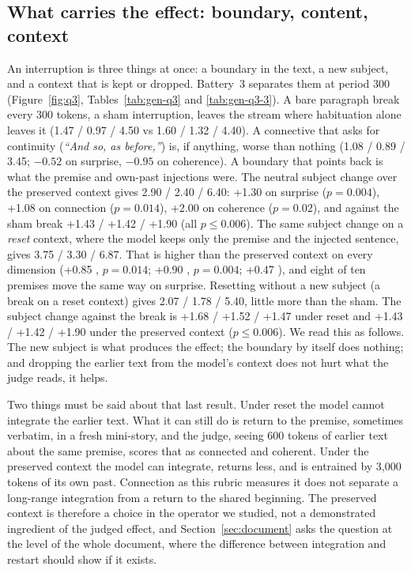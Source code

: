 \subsection{What carries the effect: boundary, content, context}
\label{sec:battery3}

An interruption is three things at once: a boundary in the text, a new
subject, and a context that is kept or dropped. Battery~3 separates them at
period 300 (Figure~\ref{fig:q3}, Tables~\ref{tab:gen-q3} and
\ref{tab:gen-q3-3}). A bare paragraph break every 300 tokens, a sham
interruption, leaves the stream where habituation alone leaves it (1.47 /
0.97 / 4.50 vs 1.60 / 1.32 / 4.40). A connective that asks for continuity
(\emph{``And so, as before,''}) is, if anything, worse than nothing (1.08 /
0.89 / 3.45; $-0.52$  on surprise, $-0.95$ on coherence). A
boundary that points back is what the premise and own-past injections were.
The neutral subject change over the preserved context gives 2.90 / 2.40 /
6.40: +1.30  on surprise ($p=0.004$), +1.08 on connection
($p=0.014$), +2.00 on coherence ($p=0.02$), and against the sham break +1.43
/ +1.42 / +1.90 (all $p\le0.006$). The same subject change on a \emph{reset}
context, where the model keeps only the premise and the injected sentence,
gives 3.75 / 3.30 / 6.87. That is higher than the preserved context on
every dimension (+0.85 , $p=0.014$; +0.90 ,
$p=0.004$; +0.47 ), and eight of ten premises move the same way on
surprise. Resetting without a new subject (a break on a reset context) gives
2.07 / 1.78 / 5.40, little more than the sham. The subject change against the
break is +1.68 / +1.52 / +1.47 under reset and +1.43 / +1.42 / +1.90 under
the preserved context ($p\le0.006$). We read this as follows. The new subject
is what produces the effect; the boundary by itself does nothing; and
dropping the earlier text from the model's context does not hurt what the
judge reads, it helps.

Two things must be said about that last result. Under reset the model cannot
integrate the earlier text. What it can still do is return to the premise,
sometimes verbatim, in a fresh mini-story, and the judge, seeing 600 tokens
of earlier text about the same premise, scores that as connected and
coherent. Under the preserved context the model can integrate, returns less,
and is entrained by 3,000 tokens of its own past. Connection as this rubric
measures it does not separate a long-range integration from a return to the
shared beginning. The preserved context is therefore a choice in the
operator we studied, not a demonstrated ingredient of the judged effect, and
Section~\ref{sec:document} asks the question at the level of the whole
document, where the difference between integration and restart should show
if it exists.

